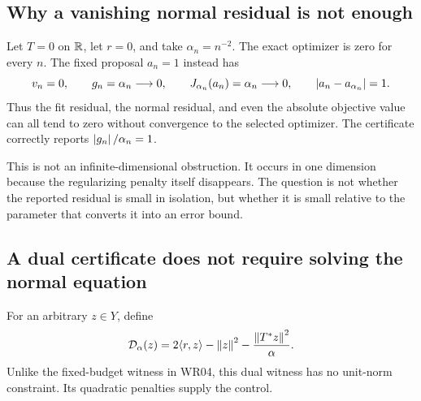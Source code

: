 
\subsection{Why a vanishing normal residual is not enough}
Let $T=0$ on $\mathbb R$, let $r=0$, and take $\alpha_n=n^{-2}$. The exact optimizer is zero for every $n$. The fixed proposal $a_n=1$ instead has
\[
 v_n=0,\qquad g_n=\alpha_n\longrightarrow0,\qquad
 J_{\alpha_n}(a_n)=\alpha_n\longrightarrow0,
 \qquad\left\lvert a_n-a_{\alpha_n}\right\rvert=1.
\]
Thus the fit residual, the normal residual, and even the absolute objective value can all tend to zero without convergence to the selected optimizer. The certificate correctly reports $\left\lvert g_n\right\rvert/\alpha_n=1$.

This is not an infinite-dimensional obstruction. It occurs in one dimension because the regularizing penalty itself disappears. The question is not whether the reported residual is small in isolation, but whether it is small relative to the parameter that converts it into an error bound.

\subsection{A dual certificate does not require solving the normal equation}
For an arbitrary $z\in Y$, define
\[
 \mathcal D_\alpha(z)=2\langle r,z\rangle-\left\lVert z\right\rVert^2
                    -\frac{\left\lVert T^*z\right\rVert^2}{\alpha}.
\]
Unlike the fixed-budget witness in WR04, this dual witness has no unit-norm constraint. Its quadratic penalties supply the control.


